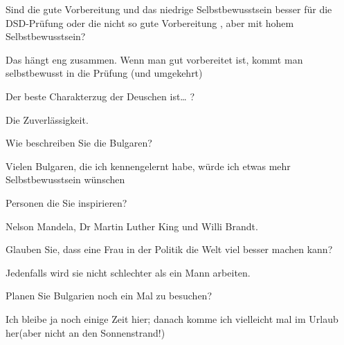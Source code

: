 \begin{multicols}{3}
Sind  die gute Vorbereitung und das niedrige Selbstbewusstsein besser für die DSD-Prüfung oder die nicht so gute Vorbereitung , aber mit hohem Selbstbewusstsein?

Das hängt eng zusammen. Wenn man gut vorbereitet ist, kommt man selbstbewusst in die Prüfung (und umgekehrt)

Der beste Charakterzug der Deuschen ist… ?

Die Zuverlässigkeit.

Wie beschreiben Sie die Bulgaren?

Vielen Bulgaren, die ich kennengelernt habe, würde ich etwas mehr Selbstbewusstsein wünschen 

Personen die Sie inspirieren?

Nelson Mandela, Dr Martin Luther King und Willi Brandt.

Glauben Sie, dass eine Frau in der Politik die Welt viel besser machen kann?

Jedenfalls wird sie nicht schlechter als ein Mann arbeiten.

Planen Sie Bulgarien noch ein Mal zu besuchen?

Ich bleibe ja noch einige Zeit hier; danach komme ich vielleicht mal im Urlaub her(aber nicht an den Sonnenstrand!)
 \closearticle
\end{multicols}